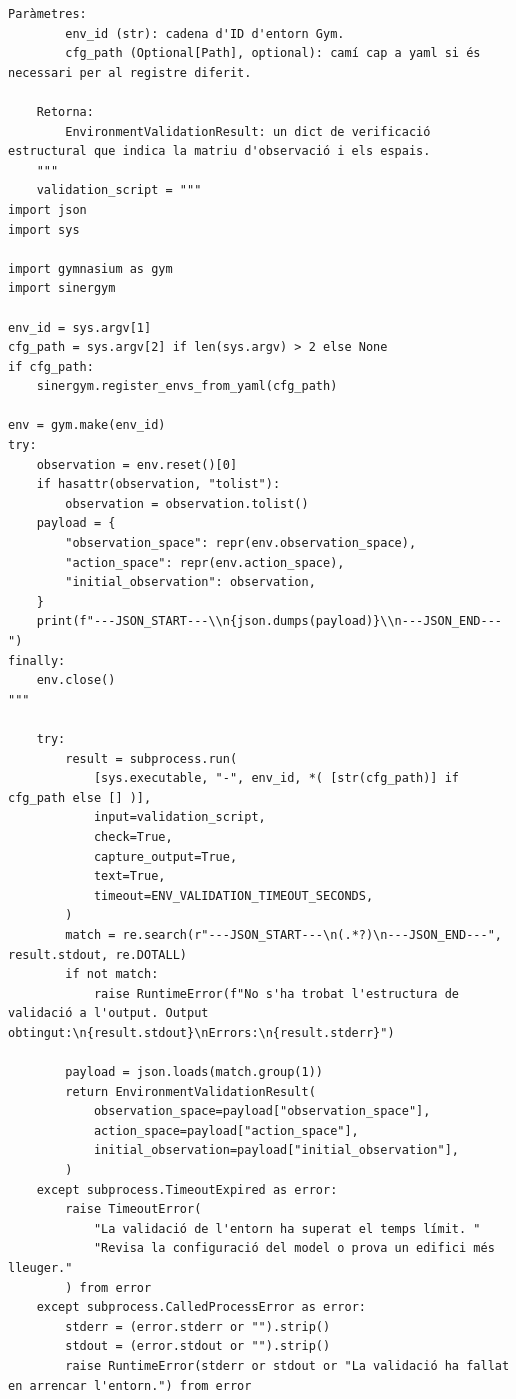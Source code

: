 \documentclass[10pt,a4paper]{article}
\begin{document}
\begin{lstlisting}[style=studioPython,caption={backend/afegir\_entorn\_config.py},label={lst:backend-afegir-entorn-config-py}]
    Paràmetres:
        env_id (str): cadena d'ID d'entorn Gym.
        cfg_path (Optional[Path], optional): camí cap a yaml si és necessari per al registre diferit.

    Retorna:
        EnvironmentValidationResult: un dict de verificació estructural que indica la matriu d'observació i els espais.
    """
    validation_script = """
import json
import sys

import gymnasium as gym
import sinergym

env_id = sys.argv[1]
cfg_path = sys.argv[2] if len(sys.argv) > 2 else None
if cfg_path:
    sinergym.register_envs_from_yaml(cfg_path)

env = gym.make(env_id)
try:
    observation = env.reset()[0]
    if hasattr(observation, "tolist"):
        observation = observation.tolist()
    payload = {
        "observation_space": repr(env.observation_space),
        "action_space": repr(env.action_space),
        "initial_observation": observation,
    }
    print(f"---JSON_START---\\n{json.dumps(payload)}\\n---JSON_END---")
finally:
    env.close()
"""

    try:
        result = subprocess.run(
            [sys.executable, "-", env_id, *( [str(cfg_path)] if cfg_path else [] )],
            input=validation_script,
            check=True,
            capture_output=True,
            text=True,
            timeout=ENV_VALIDATION_TIMEOUT_SECONDS,
        )
        match = re.search(r"---JSON_START---\n(.*?)\n---JSON_END---", result.stdout, re.DOTALL)
        if not match:
            raise RuntimeError(f"No s'ha trobat l'estructura de validació a l'output. Output obtingut:\n{result.stdout}\nErrors:\n{result.stderr}")

        payload = json.loads(match.group(1))
        return EnvironmentValidationResult(
            observation_space=payload["observation_space"],
            action_space=payload["action_space"],
            initial_observation=payload["initial_observation"],
        )
    except subprocess.TimeoutExpired as error:
        raise TimeoutError(
            "La validació de l'entorn ha superat el temps límit. "
            "Revisa la configuració del model o prova un edifici més lleuger."
        ) from error
    except subprocess.CalledProcessError as error:
        stderr = (error.stderr or "").strip()
        stdout = (error.stdout or "").strip()
        raise RuntimeError(stderr or stdout or "La validació ha fallat en arrencar l'entorn.") from error



\end{lstlisting}
\end{document}
